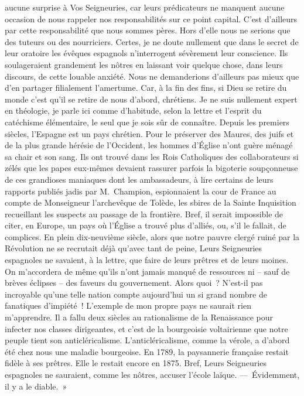 \documentclass[french,twoside]{book} %
\begin{document}
aucune surprise à Vos Seigneuries, car leurs prédicateurs ne manquent aucune occasion de nous rappeler nos responsabilités sur ce point capital. C’est d’ailleurs par cette responsabilité que nous sommes pères. Hors d’elle nous ne serions que des tuteurs ou des nourriciers. Certes, je ne doute nullement que dans le secret de leur oratoire les évêques espagnols n’interrogent sévèrement leur conscience. Ils soulageraient grandement les nôtres en laissant voir quelque chose, dans leurs discours, de cette louable anxiété. Nous ne demanderions d’ailleurs pas mieux que d’en partager filialement l’amertume. Car, à la fin des fins, si Dieu se retire du monde c’est qu’il se retire de nous d’abord, chrétiens. Je ne suis nullement expert en théologie, je parle ici comme d’habitude, selon la lettre et l’esprit du catéchisme élémentaire, le seul que je sois sûr de connaître. Depuis les premiers siècles, l’Espagne est un pays chrétien. Pour le préserver des Maures, des juifs et de la plus grande hérésie de l’Occident, les hommes d’Église n’ont guère ménagé sa chair et son sang. Ils ont trouvé dans les Rois Catholiques des collaborateurs si zélés que les papes eux-mêmes devaient rassurer parfois la bigoterie soupçonneuse de ces grandioses maniaques dont les ambassadeurs, à lire certains de leurs rapports publiés jadis par M. Champion, espionnaient la cour de France au compte de Monseigneur l’archevêque de Tolède, les sbires de la Sainte Inquisition recueillant les suspects au passage de la frontière. Bref, il serait impossible de citer, en Europe, un pays où l’Église a trouvé plus d’alliés, ou, s’il le fallait, de complices. En plein dix-neuvième siècle, alors que notre pauvre clergé ruiné par la Révolution ne se recrutait déjà qu’avec tant de peine, Leurs Seigneuries espagnoles ne savaient, à la lettre, que faire de leurs prêtres et de leurs moines. On m’accordera de même qu’ils n’ont jamais manqué de ressources ni – sauf de brèves éclipses – des faveurs du gouvernement. Alors quoi ? N’est-il pas incroyable qu’une telle nation compte aujourd’hui un si grand nombre de fanatiques d’impiété ! L’exemple de mon propre pays ne saurait rien m’apprendre. Il a fallu deux siècles au rationalisme de la Renaissance pour infecter nos classes dirigeantes, et c’est de la bourgeoisie voltairienne que notre peuple tient son anticléricalisme. L’anticléricalisme, comme la vérole, a d’abord été chez nous une maladie bourgeoise. En 1789, la paysannerie française restait fidèle à ses prêtres. Elle le restait encore en 1875. Bref, Leurs Seigneuries espagnoles ne sauraient, comme les nôtres, accuser l’école laïque. — Évidemment, il y a le diable. »\par
 \par
\end{document}
